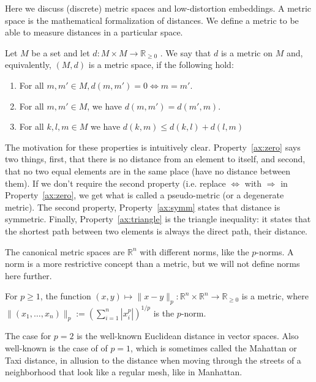 Here we discuss (discrete) metric spaces and low-distortion embeddings.
A metric space is the mathematical formalization of distances. 
We define a metric to be able to measure distances in a particular space. 

\begin{defn}
Let $M$ be a set and let $d : M \times M \rightarrow \mathbb{R}_{\geq 0}$ .
We say that $d$ is a metric on $M$ and, equivalently, $(M,d)$ is a metric space, if the following hold:
\begin{enumerate}
\item\label{ax:zero} For all $m,m' \in M, d(m,m') = 0 \Leftrightarrow m = m'$.
\item\label{ax:symm} For all $m,m' \in M$, we have $d(m,m') = d(m',m)$.
\item\label{ax:triangle} For all $k,l,m \in M$ we have $d(k,m) \leq d(k,l) + d(l,m)$
\end{enumerate}
\end{defn}

The motivation for these properties is intuitively clear.
Property~\ref{ax:zero} says two things, first, that there is no distance from an element to itself, and second, that no two equal elements are in the same place (have no distance between them).
If we don't require the second property (i.e. replace $\Leftrightarrow$ with $\Rightarrow$ in Property~\ref{ax:zero}, we get what is called a pseudo-metric (or a degenerate metric).
The second property, Property~\ref{ax:symm} states that distance is symmetric.
Finally, Property~\ref{ax:triangle} is the triangle inequality: it states that the shortest path between two elements is always the direct path, their distance.

The canonical metric spaces are $\mathbb{R}^n$ with different norms, like the $p$-norms.
A norm is a more restrictive concept than a metric, but we will not define norms here further.
\begin{ex}
    For $p \geq 1$, the function $(x,y) \mapsto \| x -y \|_p : \mathbb{R}^n \times \mathbb{R}^n \rightarrow \mathbb{R}_{\geq 0}$ is a metric, where 
    $\| (x_1,\ldots,x_n) \|_p := (\sum_{i=1}^n|x_i^p|)^{1/p}$ is the $p$-norm.
\end{ex}

The case for $p = 2$ is the well-known Euclidean distance in vector spaces.
Also well-known is the case of of $p=1$, which is sometimes called the Mahattan or Taxi distance, in allusion to the distance when moving through the streets of a neighborhood that look like a regular mesh, like in Manhattan.

